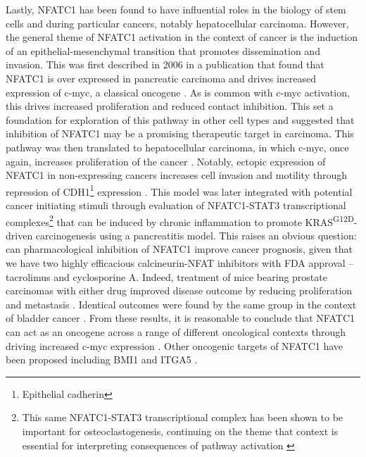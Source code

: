 Lastly, NFATC1 has been found to have influential roles in the biology of stem cells and during particular cancers, notably hepatocellular carcinoma. However, the general theme of NFATC1 activation in the context of cancer is the induction of an epithelial\hyp{}mesenchymal transition that promotes dissemination and invasion. This was first described in 2006 in a publication that found that NFATC1 is over expressed in pancreatic carcinoma and drives increased expression of c\hyp{}myc, a classical oncogene \citep{Buchholz2006, Eerola2019}. As is common with c\hyp{}myc activation, this drives increased proliferation and reduced contact inhibition. This set a foundation for exploration of this pathway in other cell types and suggested that inhibition of NFATC1 may be a promising therapeutic target in carcinoma. This pathway was then translated to hepatocellular carcinoma, in which c\hyp{}myc, once again, increases proliferation of the cancer \citep{Wang2012}. Notably, ectopic expression of NFATC1 in non\hyp{}expressing cancers increases cell invasion and motility through repression of CDH1\footnote{Epithelial cadherin} expression \citep{Oikawa2013}. This model was later integrated with potential cancer initiating stimuli through evaluation of NFATC1\hyp{}STAT3 transcriptional complexes\footnote{This same NFATC1\hyp{}STAT3 transcriptional complex has been shown to be important for osteoclastogenesis, continuing on the theme that context is essential for interpreting consequences of pathway activation \citep{Baumgart2014}} that can be induced by chronic inflammation to promote KRAS\textsuperscript{G12D}\hyp{}driven carcinogenesis using a pancreatitis model. This raises an obvious question: can pharmacological inhibition of NFATC1 improve cancer prognosis, given that we have two highly efficacious calcineurin\hyp{}NFAT inhibitors with FDA approval -- tacrolimus and cyclosporine A. Indeed, treatment of mice bearing prostate carcinomas with either drug improved disease outcome by reducing proliferation and metastasis \citep{Kawahara2015a}. Identical outcomes were found by the same group in the context of bladder cancer \citep{Kawahara2015b}. From these results, it is reasonable to conclude that NFATC1 can act as an oncogene across a range of different oncological contexts through driving increased c\hyp{}myc expression \citep{Buchholz2006, Flockhart2009, Seifert2009, Oikawa2013, Kawahara2015a, Kawahara2015b, Liu2021b}. Other oncogenic targets of NFATC1 have been proposed including BMI1 \citep{Wu2019} and ITGA5 \citep{Eerola2019}. 

